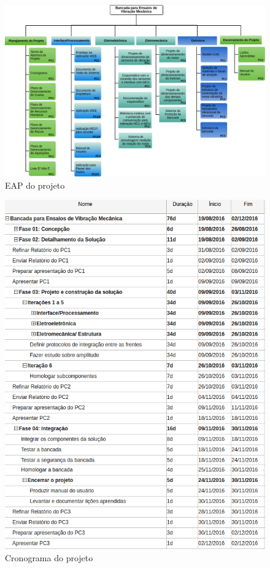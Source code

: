\begin{figure}[!ht]
\centering
\includegraphics[keepaspectratio=true,scale=0.6,angle=90]{figuras/eap.png}
\caption{EAP do projeto}
\label{eap}
\end{figure}

\begin{figure}[!ht]
\centering
\includegraphics[scale=0.9]{figuras/cronograma_macro.png}
\caption{Cronograma do projeto}
\label{cronograma}
\end{figure}

